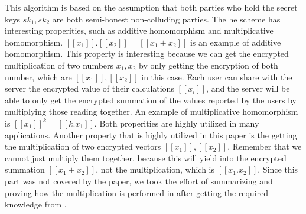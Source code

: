 This algorithm is based on the assumption that both parties who hold the secret keys $sk_1, sk_2$ are both semi-honest non-colluding parties.
The \ac{he} scheme has interesting properities, such as additive homomorphism and multiplicative homomorphism.
$[[x_1]].[[x_2]] = [[x_1 + x_2]]$ is an example of additive homomorphism.
This property is interesting because we can get the encrypted multiplication of two numbers $x_1, x_2$ by only getting the encryption of both number, which are $[[x_1]], [[x_2]]$ in this case.
Each user can share with the server the encrypted value of their calculations $[[x_i]]$, and the server will be able to only get the encrypted summation of the values reported by the users by multiplying those reading together.
An example of multiplicative homomorphism is $[[x_1]]^k = [[k . x_1]]$.
Both properities are highly utilized in many applications.
Another property that is highly utilized in this paper is the getting the multiplication of two encrypted vectors $[[x_1]], [[x_2]]$.
Remember that we cannot just multiply them together, because this will yield into the encrypted summation $[[x_1 + x_2]]$, not the multiplication, which is $[[x_1 . x_2]]$.
Since this part was not covered by the paper, we took the effort of summarizing and proving how the multiplication is performed in  after getting the required knowledge from \cite{liu2016efficient2}.

